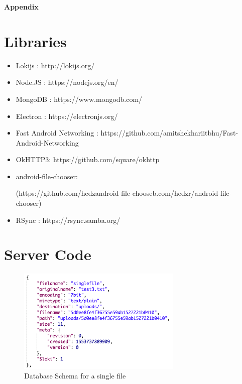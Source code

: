 \documentclass[11pt]{article}
\begin{document}
\begin{thebibliography}{9}
\end{thebibliography}

\textbf{Appendix}

\appendix

\section{Libraries}

\begin{itemize}
  \item Lokijs : http://lokijs.org/
  \item Node.JS : https://nodejs.org/en/
  \item MongoDB : https://www.mongodb.com/
  \item Electron : https://electronjs.org/
  \item Fast Android Networking : https://github.com/amitshekhariitbhu/Fast-Android-Networking
  \item OkHTTP3: https://github.com/square/okhttp
  \item android-file-chooser: 
  
  (https://github.com/hedzandroid-file-chooseb.com/hedzr/android-file-chooser)
  \item RSync : https://rsync.samba.org/
\end{itemize}

\section{Server Code}

\setcounter{figure}{0}    

\begin{figure} [H]
\caption{Database Schema for a single file}
\centering
\includegraphics[width=0.7\textwidth]{AFileSchema.PNG}
\end{figure}
\end{document}

